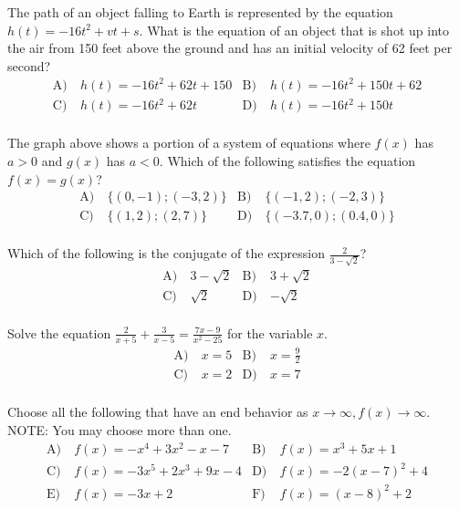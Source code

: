 \begin{problem}\label{Alg2-18}
The path of an object falling to Earth is represented by the equation  $h(t)=-16t^2+vt+s$. What is the equation of an object that is shot up into the air from 150 feet above the ground and has an initial velocity of 62 feet per second?  
\begin{align*}
\text{A)}\ & h(t)=-16t^2+62t+150 &
\text{B)}\ & h(t)=-16t^2+150t+62 \\
\text{C)}\ & h(t)=-16t^2+62t  &
\text{D)}\ & h(t)=-16t^2+150t\\
\end{align*}    
\end{problem}


\begin{problem}\label{Alg2-19}
The graph above shows a portion of a system of equations where  $f(x)$ has $a>0$ and $g(x)$ has $a<0$. Which of the following satisfies the equation $f(x)=g(x)$?   
\begin{align*}
\text{A)}\ & \{(0,-1);(-3,2)\} &
\text{B)}\ & \{(-1,2);(-2,3)\} \\
\text{C)}\ & \{(1,2);(2,7)\}  &
\text{D)}\ & \{(-3.7,0);(0.4,0)\}\\
\end{align*}    
\end{problem}


\begin{problem}\label{Alg2-20}
Which of the following is the conjugate of the expression $\frac{2}{3-\sqrt{2}}$?   
\begin{align*}
\text{A)}\ & 3-\sqrt{2} &
\text{B)}\ & 3+\sqrt{2}  \\
\text{C)}\ & \sqrt{2}  &
\text{D)}\ & -\sqrt{2}\\
\end{align*}    
\end{problem}



\begin{problem}\label{Alg2-21}
Solve the equation $\frac{2}{x+5}+\frac{3}{x-5}=\frac{7 x-9}{x^{2}-25}$ for the variable $x$.
\begin{align*}
\text{A)}\ & x=5 & 
\text{B)}\ & x=\frac{9}{2} \\
\text{C)}\ & x=2 &
\text{D)}\ & x=7\\
\end{align*}    
\end{problem}


\begin{problem}\label{Alg2-22}
Choose all the following that have an end behavior as $x \rightarrow \infty, f(x) \rightarrow \infty$. NOTE: You may choose more than one.
\begin{align*}
\text{A)}\ & f(x)=-x^{4}+3 x^{2}-x-7 &
\text{B)}\ & f(x)=x^{3}+5 x+1  \\
\text{C)}\ & f(x)=-3 x^{5}+2 x^{3}+9 x-4 &
\text{D)}\ & f(x)=-2(x-7)^{2}+4\\
\text{E)}\ & f(x)=-3 x+2 &
\text{F)}\ & f(x)=(x-8)^{2}+2\\
\end{align*}    
\end{problem}


